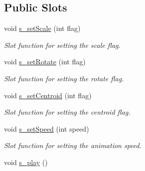 \subsection*{Public Slots}
\begin{DoxyCompactItemize}
\item 
\hypertarget{class_g_l_widget_a7ac160de2da0aa3d6ca2fbe8ac9be34b}{}void \hyperlink{class_g_l_widget_a7ac160de2da0aa3d6ca2fbe8ac9be34b}{s\+\_\+set\+Scale} (int flag)\label{class_g_l_widget_a7ac160de2da0aa3d6ca2fbe8ac9be34b}

\begin{DoxyCompactList}\small\item\em Slot function for setting the scale flag. \end{DoxyCompactList}\item 
\hypertarget{class_g_l_widget_a20fd67b0517c73ce404ef23c9fcb5e1d}{}void \hyperlink{class_g_l_widget_a20fd67b0517c73ce404ef23c9fcb5e1d}{s\+\_\+set\+Rotate} (int flag)\label{class_g_l_widget_a20fd67b0517c73ce404ef23c9fcb5e1d}

\begin{DoxyCompactList}\small\item\em Slot function for setting the rotate flag. \end{DoxyCompactList}\item 
\hypertarget{class_g_l_widget_a090fcf2a1e3ae0e462d89a72f279ac5a}{}void \hyperlink{class_g_l_widget_a090fcf2a1e3ae0e462d89a72f279ac5a}{s\+\_\+set\+Centroid} (int flag)\label{class_g_l_widget_a090fcf2a1e3ae0e462d89a72f279ac5a}

\begin{DoxyCompactList}\small\item\em Slot function for setting the centroid flag. \end{DoxyCompactList}\item 
\hypertarget{class_g_l_widget_accdba4e48f14b4b0872f2b39f2659b47}{}void \hyperlink{class_g_l_widget_accdba4e48f14b4b0872f2b39f2659b47}{s\+\_\+set\+Speed} (int speed)\label{class_g_l_widget_accdba4e48f14b4b0872f2b39f2659b47}

\begin{DoxyCompactList}\small\item\em Slot function for setting the animation speed. \end{DoxyCompactList}\item 
\hypertarget{class_g_l_widget_ada232e9c245b736f23a7f82b6d5d2ad0}{}void \hyperlink{class_g_l_widget_ada232e9c245b736f23a7f82b6d5d2ad0}{s\+\_\+play} ()\label{class_g_l_widget_ada232e9c245b736f23a7f82b6d5d2ad0}


\end{DoxyCompactItemize}
